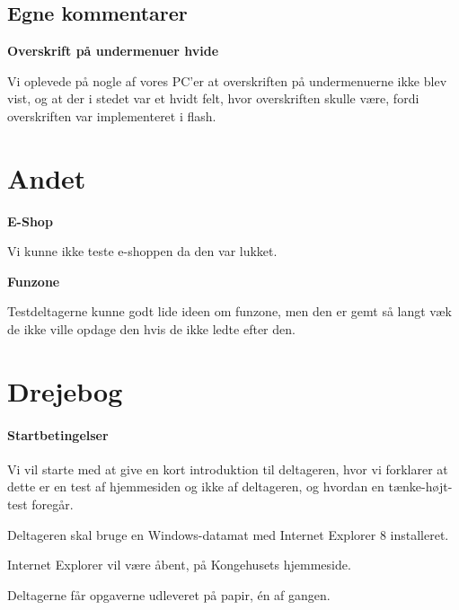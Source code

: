 \documentclass[10pt,a4paper]{article}      %
\newcommand\pic[1]{\texttt{[image: Pics/\#1]}}
\renewcommand\smallproblem{\pic{smallproblem}}
\renewcommand\criticalproblem{\pic{criticalproblem}}
\begin{document}
\subsection{Egne kommentarer} %
\label{sub:Egne kommentarer udseende}

\begin{kommentarer}
  \item[\smallproblem]{\textbf{Overskrift på undermenuer hvide}}

  Vi oplevede på nogle af vores PC'er at overskriften på undermenuerne ikke blev
  vist, og at der i stedet var et hvidt felt, hvor overskriften skulle være,
  fordi overskriften var implementeret i flash.
\end{kommentarer}

\section{Andet}
\begin{kommentarer}

\item[\criticalproblem]{\textbf{E-Shop}}

Vi kunne ikke teste e-shoppen da den var lukket.

\item[\smallproblem]{\textbf{Funzone}}

Testdeltagerne kunne godt lide ideen om funzone, men den er gemt så langt væk de ikke ville opdage den hvis de ikke ledte efter den.
\end{kommentarer}



\clearpage
\appendix
{}

\section{Drejebog}

\paragraph{Startbetingelser}
\begin{opgaver}
\item Vi vil starte med at give en kort introduktion til deltageren, hvor vi
forklarer at dette er en test af hjemmesiden og ikke af deltageren, og hvordan
en tænke-højt-test foregår.
\item Deltageren skal bruge en Windows-datamat med Internet Explorer 8
installeret.
\item Internet Explorer vil være åbent, på Kongehusets hjemmeside.
\item Deltagerne får opgaverne udleveret på papir, én af gangen.
\end{opgaver}
\end{document}
